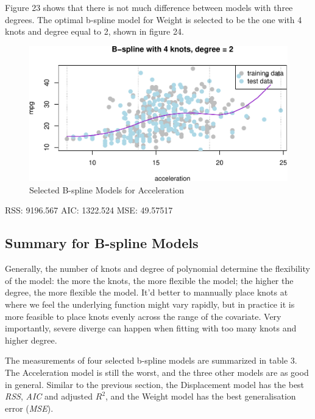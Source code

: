 \documentclass[]{article}
\begin{document}
Figure 23 shows that there is not much difference between models with
three degrees. The optimal b-spline model for Weight is selected to be
the one with 4 knots and degree equal to 2, shown in figure 24.

\begin{figure}

{\centering \includegraphics{Report_files/figure-latex/bs-a-opt-1} 

}

\caption{Selected B-spline Models for Acceleration}\label{fig:bs-a-opt}
\end{figure}

RSS: 9196.567 AIC: 1322.524 MSE: 49.57517

\hypertarget{summary-for-b-spline-models}{%
\subsection{Summary for B-spline
Models}\label{summary-for-b-spline-models}}

Generally, the number of knots and degree of polynomial determine the
flexibility of the model: the more the knots, the more flexible the
model; the higher the degree, the more flexible the model. It'd better
to mannually place knots at where we feel the underlying function might
vary rapidly, but in practice it is more feasible to place knots evenly
across the range of the covariate. Very importantly, severe diverge can
happen when fitting with too many knots and higher degree.

The measurements of four selected b-spline models are summarized in
table 3. The Acceleration model is still the worst, and the three other
models are as good in general. Similar to the previous section, the
Displacement model has the best \emph{RSS}, \emph{AIC} and adjusted
\(R^2\), and the Weight model has the best generalisation error
(\emph{MSE}).
\end{document}
